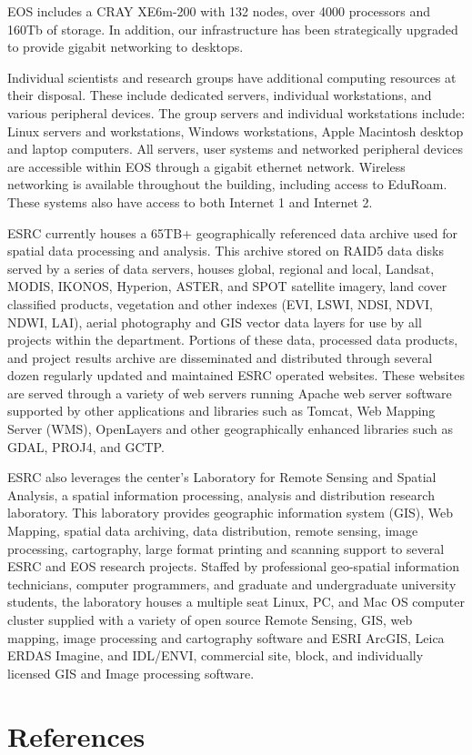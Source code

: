 \documentclass[
  letterpaper,
  DIV=11,
  numbers=noendperiod]{scrreprt}
\newlength{\cslhangindent}
\newenvironment{CSLReferences}[2] %
 {\begin{list}{}{%
  \setlength{\itemindent}{0pt}
  \setlength{\leftmargin}{0pt}
  \setlength{\parsep}{0pt}
  \ifodd #1
   \setlength{\leftmargin}{\cslhangindent}
   \setlength{\itemindent}{-1\cslhangindent}
  \fi
  \setlength{\itemsep}{#2\baselineskip}}}
 {\end{list}}
\begin{document}
EOS includes a CRAY XE6m-200 with 132 nodes, over 4000 processors and
160Tb of storage. In addition, our infrastructure has been strategically
upgraded to provide gigabit networking to desktops.

Individual scientists and research groups have additional computing
resources at their disposal. These include dedicated servers, individual
workstations, and various peripheral devices. The group servers and
individual workstations include: Linux servers and workstations, Windows
workstations, Apple Macintosh desktop and laptop computers. All servers,
user systems and networked peripheral devices are accessible within EOS
through a gigabit ethernet network. Wireless networking is available
throughout the building, including access to EduRoam. These systems also
have access to both Internet 1 and Internet 2.

ESRC currently houses a 65TB+ geographically referenced data archive
used for spatial data processing and analysis. This archive stored on
RAID5 data disks served by a series of data servers, houses global,
regional and local, Landsat, MODIS, IKONOS, Hyperion, ASTER, and SPOT
satellite imagery, land cover classified products, vegetation and other
indexes (EVI, LSWI, NDSI, NDVI, NDWI, LAI), aerial photography and GIS
vector data layers for use by all projects within the department.
Portions of these data, processed data products, and project results
archive are disseminated and distributed through several dozen regularly
updated and maintained ESRC operated websites. These websites are served
through a variety of web servers running Apache web server software
supported by other applications and libraries such as Tomcat, Web
Mapping Server (WMS), OpenLayers and other geographically enhanced
libraries such as GDAL, PROJ4, and GCTP.

ESRC also leverages the center's Laboratory for Remote Sensing and
Spatial Analysis, a spatial information processing, analysis and
distribution research laboratory. This laboratory provides geographic
information system (GIS), Web Mapping, spatial data archiving, data
distribution, remote sensing, image processing, cartography, large
format printing and scanning support to several ESRC and EOS research
projects. Staffed by professional geo-spatial information technicians,
computer programmers, and graduate and undergraduate university
students, the laboratory houses a multiple seat Linux, PC, and Mac OS
computer cluster supplied with a variety of open source Remote Sensing,
GIS, web mapping, image processing and cartography software and ESRI
ArcGIS, Leica ERDAS Imagine, and IDL/ENVI, commercial site, block, and
individually licensed GIS and Image processing software.


\chapter*{References}\label{references}


\label{refs}
\begin{CSLReferences}{0}{1}
\end{CSLReferences}
\end{document}
